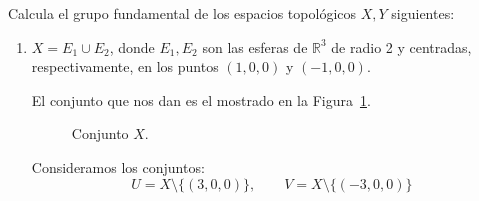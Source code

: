 \documentclass[12pt]{article}
\begin{document}
    \begin{ejercicio}
        Calcula el grupo fundamental de los espacios topológicos $X,Y$ siguientes:
        \begin{enumerate}[label=\alph*)]
            \item $X=E_1\cup E_2$, donde $E_1,E_2$ son las esferas de $\mathbb{R}^3$ de radio 2 y centradas, respectivamente, en los puntos $(1,0,0)$ y $(-1,0,0)$.

                El conjunto que nos dan es el mostrado en la Figura~\ref{fig:esferas}.
                \begin{figure}[H]
                    \centering
                    \caption{Conjunto $X$.}
                    \label{fig:esferas}
                \end{figure}
                
                Consideramos los conjuntos:
                \begin{equation*}
                    U = X\setminus \{(3,0,0)\}, \qquad V = X\setminus \{(-3,0,0)\}
                \end{equation*}
                

\end{enumerate}
\end{ejercicio}
\end{document}
